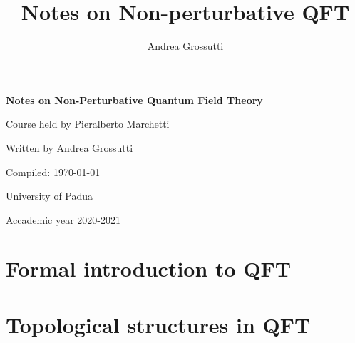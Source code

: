 \documentclass[a4paper]{report}
\title{Notes on Non-perturbative QFT}
\author{Andrea Grossutti}
\begin{document}
\renewcommand{\onlyinsubfile}[1]{}
\renewcommand{\onlyinmainfile}[1]{#1}

\begin{titlepage}
   \begin{center}
       \vspace*{5cm}

       \textbf{\Huge Notes on Non-Perturbative Quantum Field Theory}

       \vspace{0.5cm}
        {\LARGE Course held by Pieralberto Marchetti}
        
        \vspace{1.5cm}
        
        {\Large Written by Andrea Grossutti}
            

       \vfill
       
       {\large Compiled: \today}
            
       \vspace{2cm}     
            
       {\large University of Padua}
            
       \vspace{0.8cm}
     
      
            
       {\large Accademic year 2020-2021}
            
   \end{center}
\end{titlepage}

\tableofcontents

\part{Formal introduction to QFT}





\part{Topological structures in QFT}


\nocite{*}
\printbibliography
\end{document}
